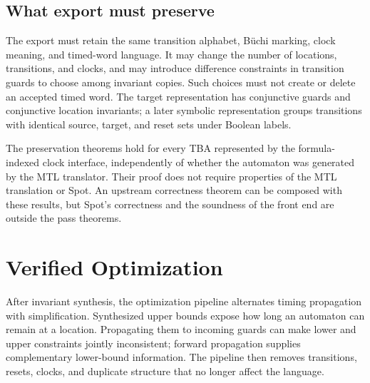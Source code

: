 \documentclass{ieeeaccess}
\begin{document}
\subsection{What export must preserve}
\label{sec:export-contract}
The export must retain the same transition alphabet, B\"uchi marking, clock meaning, and timed-word language. It may change the number of locations, transitions, and clocks, and may introduce difference constraints in transition guards to choose among invariant copies. Such choices must not create or delete an accepted timed word. The target representation has conjunctive guards and conjunctive location invariants; a later symbolic representation groups transitions with identical source, target, and reset sets under Boolean labels.

The preservation theorems hold for every TBA represented by the formula-indexed clock interface, independently of whether the automaton was generated by the MTL translator. Their proof does not require properties of the MTL translation or Spot. An upstream correctness theorem can be composed with these results, but Spot's correctness and the soundness of the front end are outside the pass theorems.

\section{Verified Optimization}
\label{sec:post}
After invariant synthesis, the optimization pipeline alternates timing propagation with simplification. Synthesized upper bounds expose how long an automaton can remain at a location. Propagating them to incoming guards can make lower and upper constraints jointly inconsistent; forward propagation supplies complementary lower-bound information. The pipeline then removes transitions, resets, clocks, and duplicate structure that no longer affect the language.
\end{document}
